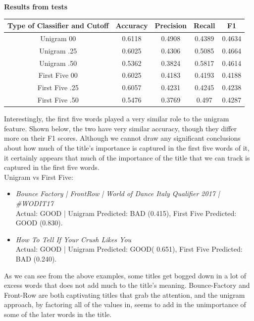 \documentclass[a4paper,12pt]{article}
\begin{document}
\textbf{Results from tests}\\

\begin{center}
 \begin{tabular}{|c| c| c| c| c|} 
 \hline
 Type of Classifier and Cutoff & Accuracy & Precision & Recall & F1 \\ [0.5ex] 
\hline
 Unigram 00 & 0.6118  & 0.4908  &0.4389  & 0.4634\\ 
 \hline
 {Unigram .25} &  0.6025& 0.4306  & 0.5085  & {0.4664}\\ 
\hline
 Unigram .50 & 0.5362  & 0.3824  & 0.5817  & 0.4614\\ 
\hline
  \hline

 \hline
 First Five 00 & 0.6025  & 0.4183  &0.4193  & 0.4188\\ 
 \hline
 {First Five .25} &  0.6057& 0.4231  & 0.4245  & {0.4238}\\ 
\hline
 First Five .50 & 0.5476  & 0.3769  & 0.497  & 0.4287\\ 
 \hline
\end{tabular}
\end{center}


Interestingly, the first five words played a very similar role to the unigram feature. Shown below, the two have very similar accuracy, though they differ more on their F1 scores. Although we cannot draw any significant conclusions about how much of the title's importance is captured in the first five words of it, it certainly appears that much of the importance of the title that we can track is captured in the first five words.
\\

Unigram vs First Five:

\begin{itemize}
		\item \textit{Bounce Factory | FrontRow | World of Dance Italy Qualifier 2017 | \#WODIT17} \\
	Actual: GOOD | Unigram Predicted: BAD (0.415), First Five Predicted: GOOD (0.830).
	
	\item \textit{How To Tell If Your Crush Likes You}\\
	 Actual: GOOD | Unigram Predicted: GOOD( 0.651), First Five Predicted: BAD (0.240).
 
 \end{itemize}
 
 As we can see from the above examples, some titles get bogged down in a lot of excess words that does not add much to the title's meaning. Bounce-Factory and Front-Row are both captivating titles that grab the attention, and the unigram approach, by factoring all of the values in, seems to add in the unimportance of some of the later words in the title.
 
\end{document}
